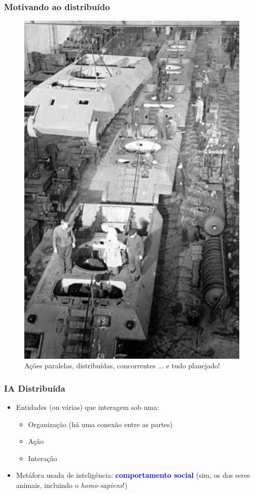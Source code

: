 \begin{frame}

  \frametitle{Motivando ao  distribuído}
        
\begin{figure}[!ht]
\centering
\includegraphics[height =.6\textheight,width=.4\textwidth]{figuras/fabrica_tanques.jpg}
\caption{Ações paralelas, distribuídas, concorrentes ... e tudo planejado!}
\end{figure}
    
   
\end{frame}




\begin{frame} %


\frametitle{IA Distribuída}

\begin{itemize}
  \item Entidades (ou várias) que interagem sob uma:
  \begin{itemize}
    \item Organização (há uma conexão entre as partes)
     \item Ação 
     \item Interação
  \end{itemize}

     \item Metáfora usada de inteligência: \textcolor{blue}{\textbf{comportamento  social}} (sim, os dos seres animais, incluindo o \textit{homo-sapiens}!)
\end{itemize}


\end{frame}

